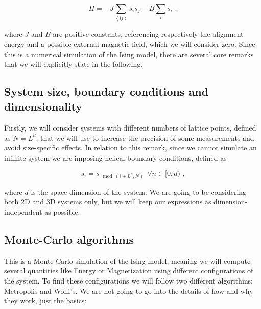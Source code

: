 \documentclass[8 pt, twocolumn]{article}
\newcommand{\avg}[1]{\left\langle #1 \right\rangle}
\begin{document}
\begin{equation} \label{eq:hamiltonian} H = - J \sum_{\avg{ij}} s_i s_j - B \sum_i s_i \text{ ,} \end{equation}

where $J$ and $B$ are positive constants, referencing respectively the alignment energy and a possible external magnetic field, which we will consider zero. Since this is a numerical simulation of the Ising model, there are several core remarks that we will explicitly state in the following.

\subsection{System size, boundary conditions and dimensionality}

Firstly, we will consider systems with different numbers of lattice points, defined as $N=L^d$, that we will use to increase the precision of some measurements and avoid size-specific effects. In relation to this remark, since we cannot simulate an infinite system we are imposing helical boundary conditions, defined as

\begin{equation} s_i = s_{\mod(i\pm L^n, N)} ~~ \forall n \in [0,d) \text{ ,} \end{equation}

where $d$ is the space dimension of the system. We are going to be considering both 2D and 3D systems only, but we will keep our expressions as dimension-independent as possible.

\subsection{Monte-Carlo algorithms}

This is a Monte-Carlo simulation of the Ising model, meaning we will compute several quantities like Energy or Magnetization using different configurations of the system. To find these configurations we will follow two different algorithms: Metropolis and Wolff's. We are not going to go into the details of how and why they work, just the basics:
\end{document}
